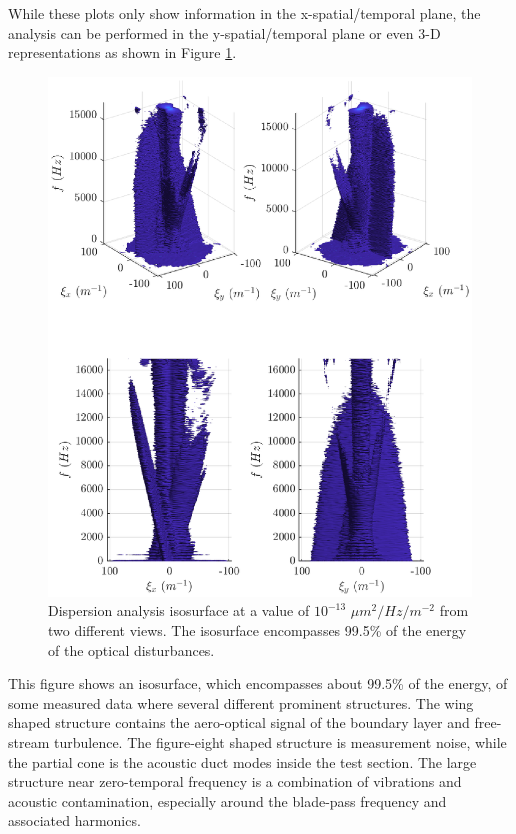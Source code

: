 While these plots only show information in the x-spatial/temporal plane, the analysis can be performed in the y-spatial/temporal plane or even 3-D representations as shown in Figure \ref{fig:04_dispersion_real}.
\begin{figure}
  \centering
  \includegraphics{../matlab/04_basic_filtering/dispersion_real.eps}
  \caption{Dispersion analysis isosurface at a value of $10^{-13}$ $\mu m^2/Hz/m^{-2}$ from two different views.  The isosurface encompasses 99.5\% of the energy of the optical disturbances.}
  \label{fig:04_dispersion_real}
\end{figure}
This figure shows an isosurface, which encompasses about 99.5\% of the energy, of some measured data where several different prominent structures.
The wing shaped structure contains the aero-optical signal of the boundary layer and free-stream turbulence.
The figure-eight shaped structure is measurement noise, while the partial cone is the acoustic duct modes inside the test section.
The large structure near zero-temporal frequency is a combination of vibrations and acoustic contamination, especially around the blade-pass frequency and associated harmonics.

